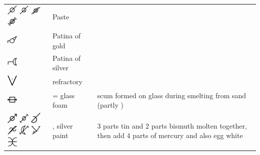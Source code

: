 \documentclass[british,final,landscape]{scrartcl}
\begin{document}
\begin{refsection}
\begin{supertabular}{p{0.3\textwidth}p{0.34\textwidth}p{0.34\textwidth}}
   \includegraphics[width=5mm]{Mixtures/Paste} \includegraphics[width=5mm]{Mixtures/Paste2} \includegraphics[width=5mm]{Mixtures/Paste3} \includegraphics[width=5mm]{Mixtures/Paste4} & Paste & \\
   \includegraphics[width=5mm]{Mixtures/PatinaOfGold} & Patina of gold & \\
   \includegraphics[width=5mm]{Mixtures/PatinaOfSilver} & Patina of silver & \\
   \includegraphics[width=5mm]{Mixtures/Refractory} & refractory & \\
   \includegraphics[width=5mm]{Mixtures/SelVitri} &  = glass foam & scum formed on glass during smelting from sand (partly )\\
   \includegraphics[width=5mm]{Mixtures/SilverPaint} \includegraphics[width=5mm]{Mixtures/SilverPaint2} \includegraphics[width=5mm]{Mixtures/SilverPaint3} \includegraphics[width=5mm]{Mixtures/SilverPaint4} \includegraphics[width=5mm]{Mixtures/SilverPaint5} \includegraphics[width=5mm]{Mixtures/SilverPaint6} \includegraphics[width=5mm]{Mixtures/SilverPaint7} & , silver paint & 3 parts tin and 2 parts bismuth molten together, then add 4 parts of mercury and also egg white \\

\end{supertabular}
\end{refsection}
\end{document}
